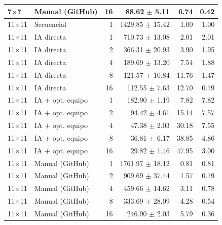 \begin{tabular}{llrrrr}
7$\times$7 & Manual (GitHub) & 16 & 88.62 $\pm$ 5.11 & 6.74 & 0.42 \\
\midrule
11$\times$11 & Secuencial & 1 & 1429.85 $\pm$ 15.42 & 1.00 & 1.00 \\
11$\times$11 & IA directa & 1 & 710.73 $\pm$ 13.08 & 2.01 & 2.01 \\
11$\times$11 & IA directa & 2 & 366.31 $\pm$ 20.93 & 3.90 & 1.95 \\
11$\times$11 & IA directa & 4 & 189.69 $\pm$ 13.20 & 7.54 & 1.88 \\
11$\times$11 & IA directa & 8 & 121.57 $\pm$ 10.84 & 11.76 & 1.47 \\
11$\times$11 & IA directa & 16 & 112.55 $\pm$ 7.63 & 12.70 & 0.79 \\
11$\times$11 & IA + opt. equipo & 1 & 182.90 $\pm$ 1.19 & 7.82 & 7.82 \\
11$\times$11 & IA + opt. equipo & 2 & 94.42 $\pm$ 4.61 & 15.14 & 7.57 \\
11$\times$11 & IA + opt. equipo & 4 & 47.38 $\pm$ 2.03 & 30.18 & 7.55 \\
11$\times$11 & IA + opt. equipo & 8 & 36.81 $\pm$ 6.17 & 38.85 & 4.86 \\
11$\times$11 & IA + opt. equipo & 16 & 29.82 $\pm$ 1.46 & 47.95 & 3.00 \\
11$\times$11 & Manual (GitHub) & 1 & 1761.97 $\pm$ 18.12 & 0.81 & 0.81 \\
11$\times$11 & Manual (GitHub) & 2 & 909.69 $\pm$ 37.44 & 1.57 & 0.79 \\
11$\times$11 & Manual (GitHub) & 4 & 459.66 $\pm$ 14.62 & 3.11 & 0.78 \\
11$\times$11 & Manual (GitHub) & 8 & 333.69 $\pm$ 28.09 & 4.28 & 0.54 \\
11$\times$11 & Manual (GitHub) & 16 & 246.90 $\pm$ 2.03 & 5.79 & 0.36 \\
\bottomrule
\end{tabular}
